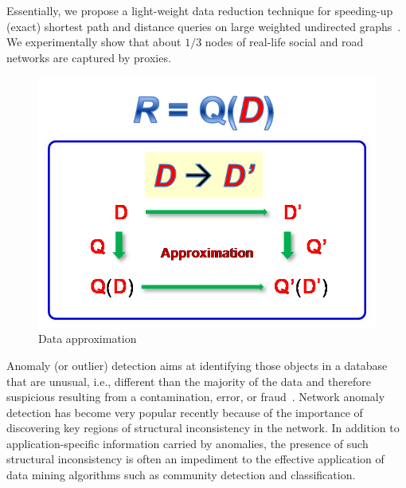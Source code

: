 Essentially, we propose a light-weight data reduction technique for speeding-up (exact)  shortest path and distance queries on large weighted undirected graphs~\cite{MaFLWCH16}. We experimentally show that about $1/3$  nodes of real-life social and road networks  are captured by proxies.



\begin{figure}[tb!]
  \begin{center}
  \includegraphics[scale=0.45]{./dataApprox.png}
  \end{center}
  \caption{Data approximation}\label{fig-tech-dataappro}
  \vspace{-2ex}
\end{figure}


Anomaly (or outlier) detection aims at identifying those objects in a database that are unusual, i.e., different than the majority of the data and therefore suspicious resulting from a contamination, error, or fraud~\cite{Zimek2017}. Network anomaly detection has become very popular
recently because of the importance of discovering key
regions of structural inconsistency in the network. In addition
to application-specific information carried by anomalies, the
presence of such structural inconsistency is often an impediment
to the effective application of data mining algorithms such as
community detection and classification.


